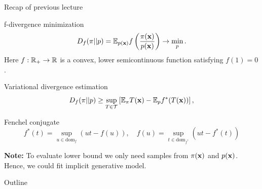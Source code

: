 \begin{frame}{Recap of previous lecture}
	\vspace{-0.3cm}
	\begin{block}{f-divergence minimization}
		\vspace{-0.3cm}
		\[
			D_f(\pi || p) = \mathbb{E}_{p(\mathbf{x})}  f\left( \frac{\pi(\mathbf{x})}{p(\mathbf{x})} \right) \rightarrow \min_p.
		\]
		Here $f: \mathbb{R}_+ \rightarrow \mathbb{R}$ is a convex, lower semicontinuous function satisfying $f(1) = 0$.
	\end{block}
	\begin{block}{Variational divergence estimation}
		\vspace{-0.3cm}
		\[
			D_f(\pi || p) \geq \sup_{T \in \mathcal{T}} \left[\mathbb{E}_{\pi}T(\mathbf{x}) -  \mathbb{E}_p f^*(T(\mathbf{x})) \right],
		\]
		\vspace{-0.7cm}
	\end{block}
	\begin{block}{Fenchel conjugate}
		\vspace{-0.7cm}
		\[
		f^*(t) = \sup_{u \in \text{dom}_f} \left( ut - f(u) \right), \quad f(u) = \sup_{t \in \text{dom}_{f^*}} \left( ut - f^*(t) \right)
		\]
		\vspace{-0.5cm}
	\end{block}
	\textbf{Note:} To evaluate lower bound we only need samples from $\pi(\mathbf{x})$ and $p(\mathbf{x})$. Hence, we could fit implicit generative model.
\end{frame}
\begin{frame}{Outline}
	\tableofcontents
\end{frame}
